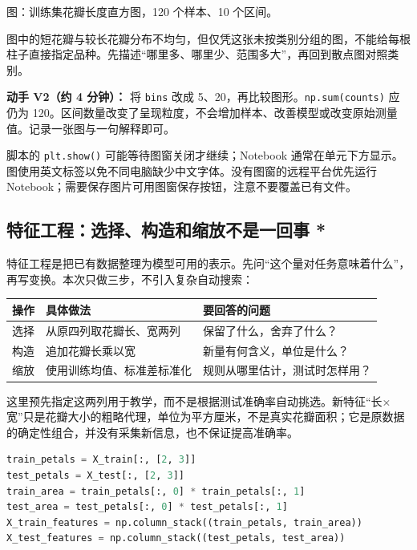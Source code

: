 \documentclass[UTF8,a4paper,11pt,fontset=fandol]{ctexart}
\providecommand{\passthrough}[1]{#1}
\begin{document}
图：训练集花瓣长度直方图，120 个样本、10 个区间。

图中的短花瓣与较长花瓣分布不均匀，但仅凭这张未按类别分组的图，不能给每根柱子直接指定品种。先描述``哪里多、哪里少、范围多大''，再回到散点图对照类别。

\textbf{动手 V2（约 4 分钟）：} 将 \passthrough{\lstinline!bins!} 改成 5、20，再比较图形。\passthrough{\lstinline!np.sum(counts)!} 应仍为 120。区间数量改变了呈现粒度，不会增加样本、改善模型或改变原始测量值。记录一张图与一句解释即可。

脚本的 \passthrough{\lstinline!plt.show()!} 可能等待图窗关闭才继续；Notebook 通常在单元下方显示。图使用英文标签以免不同电脑缺少中文字体。没有图窗的远程平台优先运行 Notebook；需要保存图片可用图窗保存按钮，注意不要覆盖已有文件。

\clearpage

\subsection{特征工程：选择、构造和缩放不是一回事 *}\label{ux7279ux5f81ux5de5ux7a0bux9009ux62e9ux6784ux9020ux548cux7f29ux653eux4e0dux662fux4e00ux56deux4e8b}

特征工程是把已有数据整理为模型可用的表示。先问``这个量对任务意味着什么''，再写变换。本次只做三步，不引入复杂自动搜索：

\begin{longtable}[]{@{}lll@{}}
\toprule\noalign{}
操作 & 具体做法 & 要回答的问题 \\
\midrule\noalign{}
\endhead
\bottomrule\noalign{}
\endlastfoot
选择 & 从原四列取花瓣长、宽两列 & 保留了什么，舍弃了什么？ \\
构造 & 追加花瓣长乘以宽 & 新量有何含义，单位是什么？ \\
缩放 & 使用训练均值、标准差标准化 & 规则从哪里估计，测试时怎样用？ \\
\end{longtable}

这里预先指定这两列用于教学，而不是根据测试准确率自动挑选。新特征``长×宽''只是花瓣大小的粗略代理，单位为平方厘米，不是真实花瓣面积；它是原数据的确定性组合，并没有采集新信息，也不保证提高准确率。

\begin{lstlisting}[language=Python]
train_petals = X_train[:, [2, 3]]
test_petals = X_test[:, [2, 3]]
train_area = train_petals[:, 0] * train_petals[:, 1]
test_area = test_petals[:, 0] * test_petals[:, 1]
X_train_features = np.column_stack((train_petals, train_area))
X_test_features = np.column_stack((test_petals, test_area))
\end{lstlisting}
\end{document}
